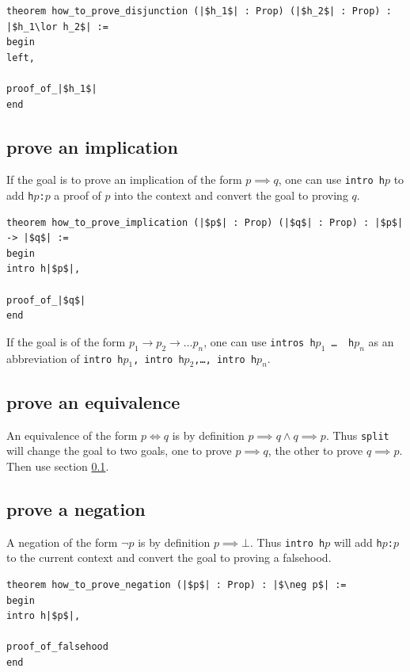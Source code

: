 \documentclass{report}
\theoremstyle{definition}
\begin{document}
\begin{verbatim}
theorem how_to_prove_disjunction (|$h_1$| : Prop) (|$h_2$| : Prop) : |$h_1\lor h_2$| :=
begin
left,
  
proof_of_|$h_1$|
end
\end{verbatim}


\subsection{prove an implication}\label{lean:imp}
If the goal is to prove an implication of the form $p \implies q$, one can use {\tt \small intro h$p$} to add {\tt \small h$p$:$p$} a proof of $p$ into the context and convert the goal to proving $q$.

\begin{verbatim}
theorem how_to_prove_implication (|$p$| : Prop) (|$q$| : Prop) : |$p$| -> |$q$| :=
begin
intro h|$p$|,
  
proof_of_|$q$|
end
\end{verbatim}

If the goal is of the form $p_1\to p_2\to\dots p_n$, one can use {\tt \small intros h$p_1$ \dots\, h$p_n$} as an abbreviation of {\tt \small intro h$p_1$, intro h$p_2$,\dots, intro h$p_n$}.


\subsection{prove an equivalence}\label{lean:eqv}
An equivalence of the form $p \iff q$ is by definition $p\implies q \land q\implies p$. Thus {\tt \small split} will change the goal to two goals, one to prove $p\implies q$, the other to prove $q \implies p$. Then use section \ref{lean:imp}.

\subsection{prove a negation}
A negation of the form $\neg p$ is by definition $p \implies \bot$. Thus {\tt \small intro h$p$} will add {\tt \small h$p$:$p$} to the current context and convert the goal to proving a falsehood.

\begin{verbatim}
theorem how_to_prove_negation (|$p$| : Prop) : |$\neg p$| :=
begin
intro h|$p$|,

proof_of_falsehood
end
\end{verbatim}
\end{document}

